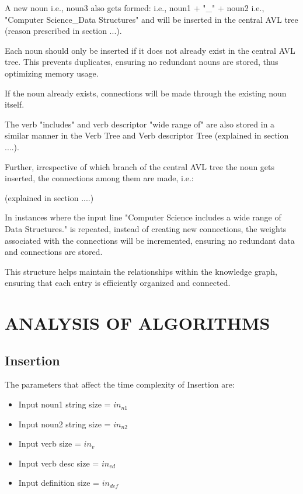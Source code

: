 \documentclass[conference]{IEEEtran}
\begin{document}
A new noun i.e., noun3 also gets formed: i.e., noun1 + "\_" + noun2 i.e., "Computer Science\_Data Structures"
and will be inserted in the central AVL tree (reason prescribed in section ...).

Each noun should only be inserted if it does not already exist in the central AVL tree. 
This prevents duplicates, ensuring no redundant nouns are stored, thus optimizing memory usage.

If the noun already exists, connections will be made through the existing noun itself.

The verb "includes" and verb descriptor "wide range of" are also stored in a similar manner
in the Verb Tree and Verb descriptor Tree (explained in section ....).

Further, irrespective of which branch of the central AVL tree the noun gets inserted, 
the connections among them are made, i.e.:


(explained in section ....)

In instances where the input line "Computer Science includes a wide range of Data Structures." is 
repeated, instead of creating new connections, the weights associated with the connections 
will be incremented, ensuring no redundant data and connections are stored.

This structure helps maintain the relationships within the knowledge graph, 
ensuring that each entry is efficiently organized and connected.

\section{ANALYSIS OF ALGORITHMS}
\subsection{Insertion}
The parameters that affect the time complexity of Insertion are:
\begin{itemize}
    \item Input noun1 string size = $in_{n1}$
    \item Input noun2 string size = $in_{n2}$
    \item Input verb size = $in_{v}$
    \item Input verb desc size = $in_{vd}$
    \item Input definition size = $in_{def}$
\end{itemize}
\end{document}
